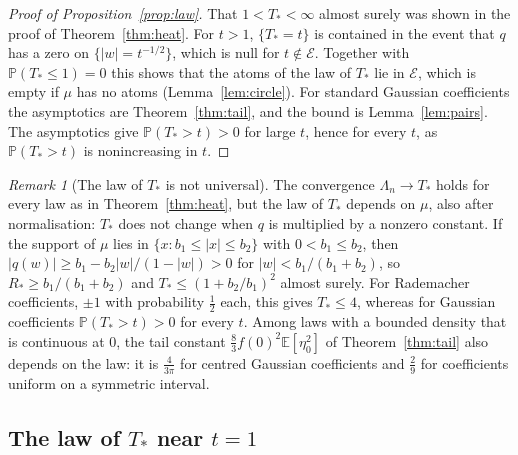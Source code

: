 \documentclass[11pt]{amsart}
\theoremstyle{definition}
\theoremstyle{remark}
\newtheorem{remark}[theorem]{Remark}
\numberwithin{equation}{section}
\newcommand{\E}{\mathbb{E}}
\newcommand{\PP}{\mathbb{P}}
\begin{document}
\begin{proof}[Proof of Proposition~\ref{prop:law}]
That $1<T_*<\infty$ almost surely was shown in the proof of Theorem~\ref{thm:heat}. For $t>1$, $\{T_*=t\}$ is contained in the event that $q$ has a zero on $\{|w|=t^{-1/2}\}$, which is null for $t\notin\mathcal E$. Together with $\PP(T_*\le1)=0$ this shows that the atoms of the law of $T_*$ lie in $\mathcal E$, which is empty if $\mu$ has no atoms (Lemma~\ref{lem:circle}). For standard Gaussian coefficients the asymptotics are Theorem~\ref{thm:tail}, and the bound is Lemma~\ref{lem:pairs}. The asymptotics give $\PP(T_*>t)>0$ for large $t$, hence for every $t$, as $\PP(T_*>t)$ is nonincreasing in $t$.
\end{proof}

\begin{remark}[The law of $T_*$ is not universal]\label{rem:nonuniversal}
The convergence $\Lambda_n\to T_*$ holds for every law as in Theorem~\ref{thm:heat}, but the law of $T_*$ depends on $\mu$, also after normalisation: $T_*$ does not change when $q$ is multiplied by a nonzero constant. If the support of $\mu$ lies in $\{x:b_1\le|x|\le b_2\}$ with $0<b_1\le b_2$, then $|q(w)|\ge b_1-b_2|w|/(1-|w|)>0$ for $|w|<b_1/(b_1+b_2)$, so $R_*\ge b_1/(b_1+b_2)$ and $T_*\le(1+b_2/b_1)^2$ almost surely. For Rademacher coefficients, $\pm1$ with probability $\frac12$ each, this gives $T_*\le4$, whereas for Gaussian coefficients $\PP(T_*>t)>0$ for every $t$. Among laws with a bounded density that is continuous at $0$, the tail constant $\frac83f(0)^2\E[\eta_0^2]$ of Theorem~\ref{thm:tail} also depends on the law: it is $\frac4{3\pi}$ for centred Gaussian coefficients and $\frac29$ for coefficients uniform on a symmetric interval.
\end{remark}

\subsection{The law of \texorpdfstring{$T_*$}{T*} near \texorpdfstring{$t=1$}{t=1}}\label{subsec:fredholm}
\end{document}
